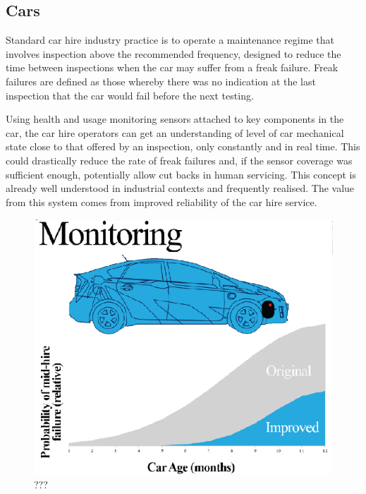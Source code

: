 \documentclass[conference]{IEEEtran}
\begin{document}
\subsection{Cars}

Standard car hire industry practice is to operate a maintenance regime
that involves inspection above the recommended frequency, designed to
reduce the time between inspections when the car may suffer from a
freak failure. Freak failures are defined as those whereby there was
no indication at the last inspection that the car would fail before
the next testing.

Using health and usage monitoring sensors attached to key components
in the car, the car hire operators can get an understanding of level
of car mechanical state close to that offered by an inspection, only
constantly and in real time. This could drastically reduce the rate of
freak failures and, if the sensor coverage was sufficient enough,
potentially allow cut backs in human servicing.  This concept is
already well understood in industrial contexts and frequently
realised. The value from this system comes from improved reliability
of the car hire service.

\begin{figure}[!htp]
\centering
\includegraphics[width=\columnwidth]{images/carage.png}
\caption{???}
\label{fig:carage}
\end{figure}
\end{document}
